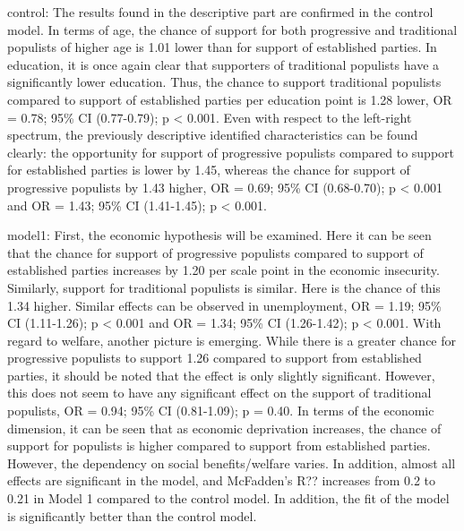 \documentclass[]{article}
\begin{document}
control: The results found in the descriptive part are confirmed in the
control model. In terms of age, the chance of support for both
progressive and traditional populists of higher age is 1.01 lower than
for support of established parties. In education, it is once again clear
that supporters of traditional populists have a significantly lower
education. Thus, the chance to support traditional populists compared to
support of established parties per education point is 1.28 lower, OR =
0.78; 95\% CI (0.77-0.79); p \textless{} 0.001. Even with respect to the
left-right spectrum, the previously descriptive identified
characteristics can be found clearly: the opportunity for support of
progressive populists compared to support for established parties is
lower by 1.45, whereas the chance for support of progressive populists
by 1.43 higher, OR = 0.69; 95\% CI (0.68-0.70); p \textless{} 0.001 and
OR = 1.43; 95\% CI (1.41-1.45); p \textless{} 0.001.

model1: First, the economic hypothesis will be examined. Here it can be
seen that the chance for support of progressive populists compared to
support of established parties increases by 1.20 per scale point in the
economic insecurity. Similarly, support for traditional populists is
similar. Here is the chance of this 1.34 higher. Similar effects can be
observed in unemployment, OR = 1.19; 95\% CI (1.11-1.26); p \textless{}
0.001 and OR = 1.34; 95\% CI (1.26-1.42); p \textless{} 0.001. With
regard to welfare, another picture is emerging. While there is a greater
chance for progressive populists to support 1.26 compared to support
from established parties, it should be noted that the effect is only
slightly significant. However, this does not seem to have any
significant effect on the support of traditional populists, OR = 0.94;
95\% CI (0.81-1.09); p = 0.40. In terms of the economic dimension, it
can be seen that as economic deprivation increases, the chance of
support for populists is higher compared to support from established
parties. However, the dependency on social benefits/welfare varies. In
addition, almost all effects are significant in the model, and
McFadden's R?? increases from 0.2 to 0.21 in Model 1 compared to the
control model. In addition, the fit of the model is significantly better
than the control model.
\end{document}
